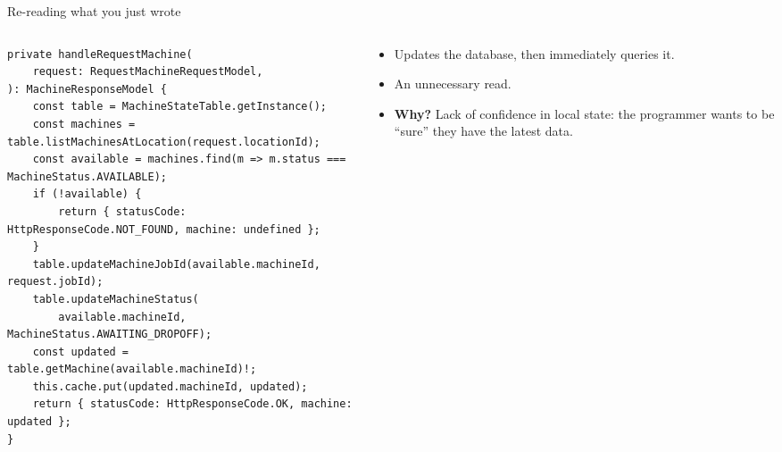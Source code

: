 \documentclass[aspectratio=169]{beamer}
\newenvironment{sample}[1]
  {\samplelabel{#1}\begin{columns}[T]\begin{column}{0.66\textwidth}}
  {\end{column}\end{columns}}
\newcommand{\review}{\end{column}\begin{column}{0.31\textwidth}\footnotesize}
\begin{document}
\begin{frame}[fragile]{Re-reading what you just wrote}
\begin{sample}{A}
\begin{lstlisting}
private handleRequestMachine(
    request: RequestMachineRequestModel,
): MachineResponseModel {
    const table = MachineStateTable.getInstance();
    const machines = table.listMachinesAtLocation(request.locationId);
    const available = machines.find(m => m.status === MachineStatus.AVAILABLE);
    if (!available) {
        return { statusCode: HttpResponseCode.NOT_FOUND, machine: undefined };
    }
    table.updateMachineJobId(available.machineId, request.jobId);
    table.updateMachineStatus(
        available.machineId, MachineStatus.AWAITING_DROPOFF);
    const updated = table.getMachine(available.machineId)!;
    this.cache.put(updated.machineId, updated);
    return { statusCode: HttpResponseCode.OK, machine: updated };
}
\end{lstlisting}
\review
\begin{itemize}
  \item<2-> Updates the database, then immediately queries it.
  \item<2-> An unnecessary read.
  \item<3-> \textbf{Why?} Lack of confidence in local state: the programmer wants to be
    ``sure'' they have the latest data.
\end{itemize}
\end{sample}
\end{frame}
\end{document}
